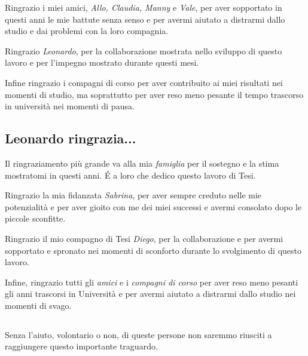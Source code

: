 Ringrazio i miei amici, \textit{Allo, Claudia, Manny} e \textit{Vale}, per aver sopportato in questi anni le mie battute senza senso e per avermi aiutato a distrarmi dallo studio e dai problemi con la loro compagnia.

Ringrazio \textit{Leonardo}, per la collaborazione mostrata nello sviluppo di questo lavoro e per l'impegno mostrato durante questi mesi.

Infine ringrazio i compagni di corso per aver contribuito ai miei risultati nei momenti di studio, ma soprattutto per aver reso meno pesante il tempo trascorso in università nei momenti di pausa.

\subsection*{Leonardo ringrazia...}

Il ringraziamento più grande va alla mia \textit{famiglia} per il sostegno e la stima mostratomi in questi anni. \'E a loro che dedico questo lavoro di Tesi.

Ringrazio la mia fidanzata \textit{Sabrina}, per aver sempre creduto nelle mie potenzialità e per aver gioito con me dei miei successi e avermi consolato dopo le piccole sconfitte. 

Ringrazio il mio compagno di Tesi \textit{Diego}, per la collaborazione e per avermi sopportato e spronato nei momenti di sconforto durante lo svolgimento di questo lavoro.

Infine, ringrazio tutti gli \textit{amici} e i \textit{compagni di corso} per aver reso meno pesanti gli anni trascorsi in Università e per avermi aiutato a distrarmi dallo studio nei momenti di svago.

\subsection*{}
Senza l'aiuto, volontario o non, di queste persone non saremmo riusciti a raggiungere questo importante traguardo.